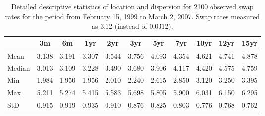 \documentclass[11pt, a4paper, twosided]{book}
\begin{document}
\begin{table}[ht]
    \begin{center}
        {\footnotesize
        \begin{tabular}{l|cccccccccc}
        \hline \hline
                        & 3m    & 6m    & 1yr   & 2yr   & 3yr   & 5yr   & 7yr   & 10yr  & 12yr  & 15yr   \\
            \hline
                Mean   & 3.138 & 3.191 & 3.307 & 3.544 & 3.756 & 4.093 & 4.354 & 4.621 & 4.741 & 4.878  \\
                Median & 3.013 & 3.109 & 3.228 & 3.490 & 3.680 & 3.906 & 4.117 & 4.420 & 4.575 & 4.759  \\
                Min    & 1.984 & 1.950 & 1.956 & 2.010 & 2.240 & 2.615 & 2.850 & 3.120 & 3.250 & 3.395  \\
                Max    & 5.211 & 5.274 & 5.415 & 5.583 & 5.698 & 5.805 & 5.900 & 6.031 & 6.150 & 6.295  \\
                StD    & 0.915 & 0.919 & 0.935 & 0.910 & 0.876 & 0.825 & 0.803 & 0.776 & 0.768 & 0.762  \\
            \hline \hline
        \end{tabular}}
    \end{center}
    \caption{Detailed descriptive statistics of location and dispersion for
    2100 observed swap rates for the period from
    February 15, 1999 to March 2, 2007. Swap rates measured as 3.12 (instead of 0.0312).}
    \label{tab:apptable}
\end{table}
\newpage
\end{document}
